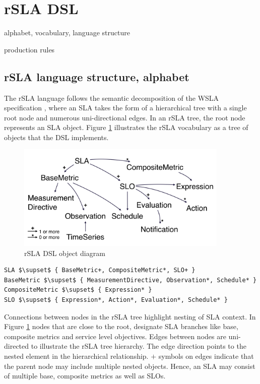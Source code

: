 \section{rSLA DSL}
\label{sec:dsl}
alphabet, vocabulary, language structure

production rules

\subsection{rSLA language structure, alphabet}

The rSLA language follows the semantic decomposition of the WSLA specification \cite{wsla}, where an SLA takes the form of a hierarchical tree with a single root node and numerous uni-directional edges. In an rSLA tree, the root node represents an SLA object. Figure \ref{rSLA_diag} illustrates the rSLA vocabulary as a tree of objects that the DSL implements. 

\begin{minipage}{0.5\textwidth}
\begin{figure}[H]
\includegraphics[width=0.9\textwidth]{pics/rslaobject}
\caption{\label{rSLA_diag} rSLA DSL object diagram}
\end{figure}
\end{minipage} \hfill
\begin{minipage}{0.5\textwidth}
\begin{lstlisting}[breaklines, mathescape, firstnumber=auto, caption=rSLA vocabulary, label=lst]
SLA $\supset$ { BaseMetric+, CompositeMetric*, SLO+ }
BaseMetric $\supset$ { MeasurementDirective, Observation*, Schedule* }
CompositeMetric $\supset$ { Expression* }
SLO $\supset$ { Expression*, Action*, Evaluation*, Schedule* }
\end{lstlisting}
\end{minipage}

Connections between nodes in the rSLA tree highlight nesting of SLA context. In Figure \ref{rSLA_diag} nodes that are close to the root, designate SLA branches like base, composite metrics and service level objectives. Edges between nodes are uni-directed to illustrate the rSLA tree hierarchy. The edge direction points to the nested element in the hierarchical relationship. $+$ symbols on edges indicate that the parent node may include multiple nested objects. Hence, an SLA may consist of multiple base, composite metrics as well as SLOs.

